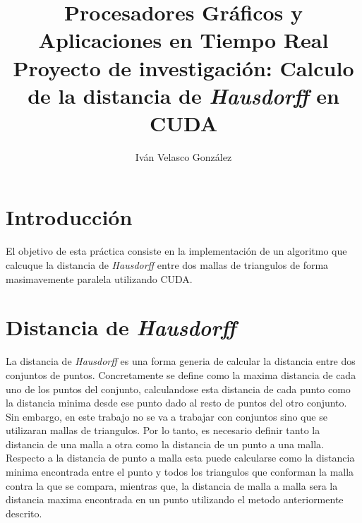 \documentclass[10pt,oneside,a4paper]{article}
\begin{document}
\begin{titlepage}

\title{\Huge Procesadores Gráficos y Aplicaciones en Tiempo Real  \\[0.7in] \LARGE Proyecto de investigación: Calculo de la distancia de \textit{Hausdorff} en CUDA\\[3.6in]}
\date{}
\author{Iván Velasco González}
\maketitle
\thispagestyle{empty}
\end{titlepage}
\newpage
\tableofcontents
\newpage

\section{Introducción}
El objetivo de esta práctica consiste en la implementación de un algoritmo que calcuque la distancia de \textit{Hausdorff} entre dos mallas de triangulos de forma masimavemente paralela utilizando CUDA.

\section{Distancia de \textit{Hausdorff}}
La distancia de \textit{Hausdorff} es una forma generia de calcular la distancia entre dos conjuntos de puntos. Concretamente se define como la maxima distancia de cada uno de los puntos del conjunto, calculandose esta distancia de cada punto como la distancia minima desde ese punto dado al resto de puntos del otro conjunto. Sin embargo, en este trabajo no se va a trabajar con conjuntos sino que se utilizaran mallas de triangulos. Por lo tanto, es necesario definir tanto la distancia de una malla a otra como la distancia de un punto a una malla. Respecto a la distancia de punto a malla esta puede calcularse como la distancia minima encontrada entre el punto y todos los triangulos que conforman la malla contra la que se compara, mientras que, la distancia de malla a malla sera la distancia maxima encontrada en un punto utilizando el metodo anteriormente descrito.
\end{document}
